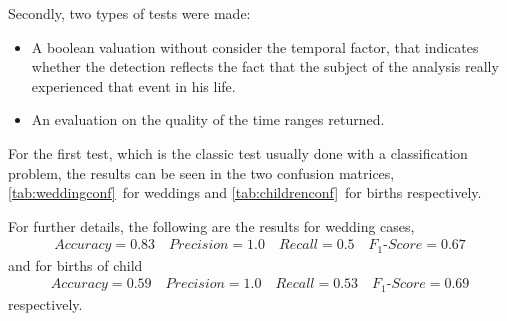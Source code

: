 Secondly, two types of tests were made:
\begin{itemize}
\item A boolean valuation without consider the temporal factor, that indicates whether the detection reflects the fact that the subject of the analysis really experienced that event in his life.
\item An evaluation on the quality of the time ranges returned.
\end{itemize}
For the first test, which is the classic test usually done with a classification problem, the results can be seen in the two confusion matrices, \ref{tab:weddingconf}~for weddings and \ref{tab:childrenconf}~for births respectively.

For further details, the following are the results for wedding cases,
\begin{gather}
Accuracy = 0.83 \quad Precision = 1.0 \quad Recall = 0.5 \quad F_1\text{-}Score = 0.67
\label{weddingconfdata}
\end{gather}
and for births of child
\begin{gather}
Accuracy = 0.59 \quad Precision = 1.0 \quad Recall = 0.53 \quad F_1\text{-}Score = 0.69
\label{childrenconfdata}
\end{gather}
respectively.

